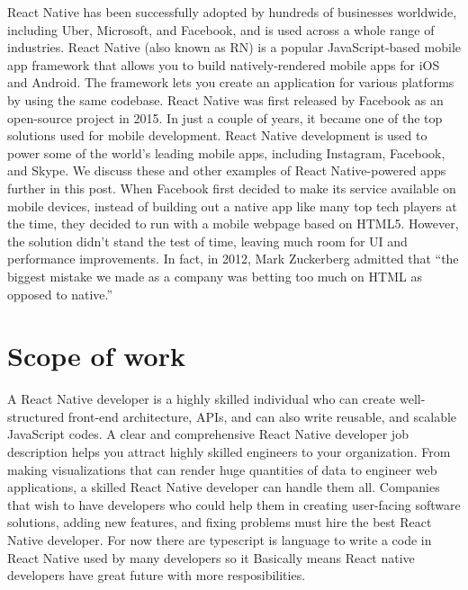 \documentclass[12pt,a4paper]{report}
\begin{document}
\hspace{0.5cm} React Native has been successfully adopted by hundreds of businesses worldwide, including Uber, Microsoft, and Facebook, and is used across a whole range of industries. React Native (also known as RN) is a popular JavaScript-based mobile app framework that allows you to build natively-rendered mobile apps for iOS and Android. The framework lets you create an application for various platforms by using the same codebase. React Native was first released by Facebook as an open-source project in 2015. In just a couple of years, it became one of the top solutions used for mobile development. React Native development is used to power some of the world’s leading mobile apps, including Instagram, Facebook, and Skype. We discuss these and other examples of React Native-powered apps further in this post. When Facebook first decided to make its service available on mobile devices, instead of building out a native app like many top tech players at the time, they decided to run with a mobile webpage based on HTML5. However, the solution didn’t stand the test of time, leaving much room for UI and performance improvements. In fact, in 2012, Mark Zuckerberg admitted that “the biggest mistake we made as a company was betting too much on HTML as opposed to native.”

\section{Scope of work}
\hspace{0.5cm} A React Native developer is a highly skilled individual who can create well-structured front-end architecture, APIs, and can also write reusable, and scalable JavaScript codes. A clear and comprehensive React Native developer job description helps you attract highly skilled engineers to your organization. From making visualizations that can render huge quantities of data to engineer web applications, a skilled React Native developer can handle them all. Companies that wish to have developers who could help them in creating user-facing software solutions, adding new features, and fixing problems must hire the best React Native developer. For now there are typescript is language to write a code in React Native used by many developers so it Basically means React native developers have great future with more resposibilities.
\end{document}
